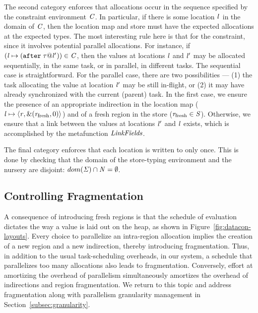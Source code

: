 \documentclass[acmsmall,acmthm=false,nonacm]{acmart}
\theoremstyle{straighttext0}
\theoremstyle{straighttext}
\newcommand{\Secref}[1]{Section~\ref{#1}}
\newcommand{\Figref}[1]{Figure~\ref{#1}}
\begin{document}
{The second category enforces that allocations occur in the sequence specified by the constraint
environment $\mathit{C}$.
%
In particular, if there is some location ${\mathit{l}}^{}$ in the domain of $\mathit{C}$,
then the location map and store must have the expected allocations at the expected types.
%
The most interesting rule here is that for the  constraint,
since it involves potential parallel allocations.
%
For instance, if $(\mathit{l} \mapsto (\texttt{after}\; \mathit{\tau} @ {\mathit{l}'}^{})) \in \mathit{C}$,
then the values at locations $\mathit{l}$ and $\mathit{l}'$ may be allocated sequentially,
in the same task, or in parallel, in different tasks.
%
The sequential case is straightforward.
%
For the parallel case, there are two possibilities --- (1) the task allocating the value at
location $\mathit{l}'$ may be still in-flight,
or (2) it may have already synchronized with the current (parent) task.
%
In the first case, we ensure the presence of an appropriate indirection in the location map
($\mathit{l} \mapsto \langle \mathit{r}, \text{\&}(\mathit{r}_{\text{fresh}},0) \rangle ^{}$)
and of a fresh region in the store ($\mathit{r}_{\text{fresh}} \in \mathit{S}$).
%
Otherwise, we ensure that a link between the values at locations $\mathit{l}'$ and $\mathit{l}$ exists,
which is accomplished by the metafunction $\mathit{LinkFields}$.

The final category enforces that each location is written to only once.
%
This is done by checking that the domain of the store-typing environment and the nursery
are disjoint: $dom(\mathit{\Sigma}) \cap \mathit{N} = \emptyset$.




\subsection{Controlling Fragmentation}
\label{subsec:fragmentation}

A consequence of \rparcalc{} introducing fresh regions
is that the schedule of evaluation dictates the way a value is laid out on the heap,
as shown in \Figref{fig:datacon-layouts}.
%
Every choice to parallelize an intra-region allocation implies the creation
of a new region and a new indirection, thereby introducing fragmentation.
%
Thus, in addition to the usual task-scheduling overheads,
in our system, a schedule that parallelizes too many allocations also leads
to fragmentation.
%
Conversely, effort at amortizing the overhead of parallelism
simultaneously amortizes the overhead of indirections and region
fragmentation.
%
We return to this topic and address fragmentation along with parallelism granularity management in \Secref{subsec:granularity}.

}
\end{document}
